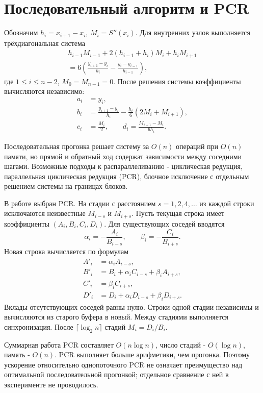 \documentclass[14pt,a4paper]{extarticle}
\begin{document}
\section{Последовательный алгоритм и PCR}
Обозначим $h_i=x_{i+1}-x_i$, $M_i=S''(x_i)$. Для внутренних узлов выполняется трёхдиагональная система
\begin{equation}\label{eq:system}
\begin{split}
h_{i-1}M_{i-1}+2(h_{i-1}+h_i)M_i+h_iM_{i+1}\\
=6\left(\frac{y_{i+1}-y_i}{h_i}-\frac{y_i-y_{i-1}}{h_{i-1}}\right),
\end{split}
\end{equation}
где $1\leq i\leq n-2$, $M_0=M_{n-1}=0$. После решения системы коэффициенты вычисляются независимо:
\begin{align}
a_i&=y_i,\\
b_i&=\frac{y_{i+1}-y_i}{h_i}-\frac{h_i}{6}(2M_i+M_{i+1}),\\
c_i&=\frac{M_i}{2},\qquad
d_i=\frac{M_{i+1}-M_i}{6h_i}.
\end{align}

Последовательная прогонка решает систему за $O(n)$ операций при $O(n)$ памяти, но прямой и обратный ход содержат зависимости между соседними шагами. Возможные подходы к распараллеливанию - циклическая редукция, параллельная циклическая редукция (PCR), блочное исключение с отдельным решением системы на границах блоков.

В работе выбран PCR. На стадии с расстоянием $s=1,2,4,\dots$ из каждой строки исключаются неизвестные $M_{i-s}$ и $M_{i+s}$. Пусть текущая строка имеет коэффициенты $(A_i,B_i,C_i,D_i)$. Для существующих соседей вводятся
\begin{equation}
\alpha_i=-\frac{A_i}{B_{i-s}},\qquad
\beta_i=-\frac{C_i}{B_{i+s}}.
\end{equation}
Новая строка вычисляется по формулам
\begin{align}
A'_i&=\alpha_i A_{i-s},\\
B'_i&=B_i+\alpha_i C_{i-s}+\beta_i A_{i+s},\\
C'_i&=\beta_i C_{i+s},\\
D'_i&=D_i+\alpha_i D_{i-s}+\beta_i D_{i+s}.
\end{align}
Вклады отсутствующих соседей равны нулю. Строки одной стадии независимы и вычисляются из старого буфера в новый. Между стадиями выполняется синхронизация. После $\lceil\log_2n\rceil$ стадий $M_i=D_i/B_i$.

Суммарная работа PCR составляет $O(n\log n)$, число стадий - $O(\log n)$, память - $O(n)$. PCR выполняет больше арифметики, чем прогонка. Поэтому ускорение относительно однопоточного PCR не означает преимущество над оптимальной последовательной прогонкой; отдельное сравнение с ней в эксперименте не проводилось.
\end{document}
